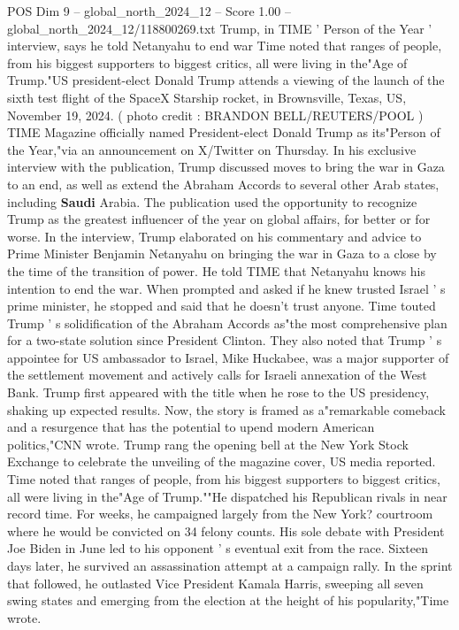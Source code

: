 \begin{textsample}{POS Dim 9 – global\_north\_2024\_12 – Score 1.00 – global\_north\_2024\_12/118800269.txt}  \label{ex:f9_pos_328}
Trump, in TIME ' Person of the Year ' interview, says he told Netanyahu to end war Time noted that ranges of people, from his biggest supporters to biggest critics, all were living in the"Age of Trump."US president-elect Donald Trump attends a viewing of the launch of the sixth test flight of the SpaceX Starship rocket, in Brownsville, Texas, US, November 19, 2024. ( photo credit : BRANDON BELL/REUTERS/POOL ) TIME Magazine officially named President-elect Donald Trump as its"Person of the Year,"via an announcement on X/Twitter on Thursday.
In his exclusive interview with the publication, Trump discussed moves to bring the war in Gaza to an end, as well as extend the Abraham Accords to several other Arab states, including \textbf{Saudi} Arabia.
The publication used the opportunity to recognize Trump as the greatest influencer of the year on global affairs, for better or for worse.
In the interview, Trump elaborated on his commentary and advice to Prime Minister Benjamin Netanyahu on bringing the war in Gaza to a close by the time of the transition of power.
He told TIME that Netanyahu knows his intention to end the war.
When prompted and asked if he knew trusted Israel ' s prime minister, he stopped and said that he doesn't trust anyone.
Time touted Trump ' s solidification of the Abraham Accords as"the most comprehensive plan for a two-state solution since President Clinton.
They also noted that Trump ' s appointee for US ambassador to Israel, Mike Huckabee, was a major supporter of the settlement movement and actively calls for Israeli annexation of the West Bank.
Trump first appeared with the title when he rose to the US presidency, shaking up expected results.
Now, the story is framed as a"remarkable comeback and a resurgence that has the potential to upend modern American politics,"CNN wrote.
Trump rang the opening bell at the New York Stock Exchange to celebrate the unveiling of the magazine cover, US media reported.
Time noted that ranges of people, from his biggest supporters to biggest critics, all were living in the"Age of Trump.""He dispatched his Republican rivals in near record time.
For weeks, he campaigned largely from the New York? courtroom where he would be convicted on 34 felony counts.
His sole debate with President Joe Biden in June led to his opponent ' s eventual exit from the race.
Sixteen days later, he survived an assassination attempt at a campaign rally.
In the sprint that followed, he outlasted Vice President Kamala Harris, sweeping all seven swing states and emerging from the election at the height of his popularity,"Time wrote.

\end{textsample}
